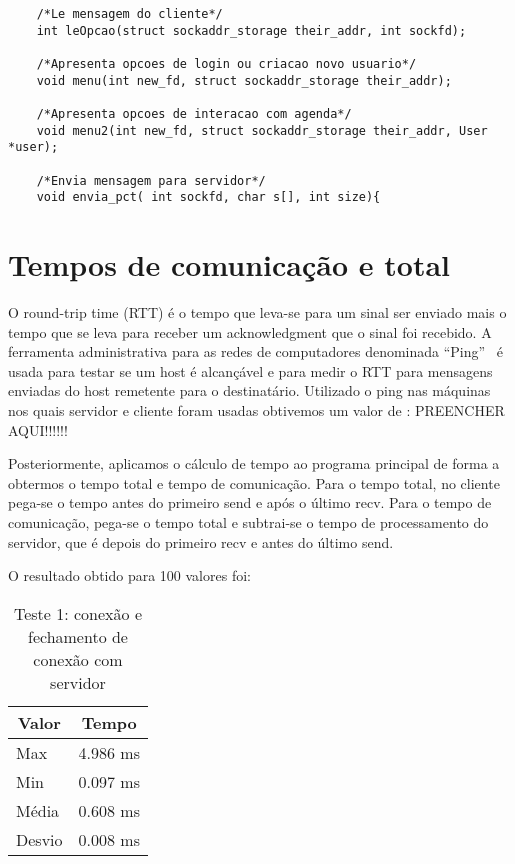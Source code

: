 \documentclass[10pt,a4paper]{article}
\begin{document}
\begin{itemize}
\begin{lstlisting}
    /*Le mensagem do cliente*/
    int leOpcao(struct sockaddr_storage their_addr, int sockfd);
   
    /*Apresenta opcoes de login ou criacao novo usuario*/
    void menu(int new_fd, struct sockaddr_storage their_addr);
  
    /*Apresenta opcoes de interacao com agenda*/
    void menu2(int new_fd, struct sockaddr_storage their_addr, User *user);

    /*Envia mensagem para servidor*/
    void envia_pct( int sockfd, char s[], int size){

  \end{lstlisting}


\end{itemize}


\section{Tempos de comunicação e total}
O round-trip time (RTT) é o tempo que leva-se para um sinal ser
enviado mais o tempo que se leva para receber um acknowledgment que o
sinal foi recebido. A ferramenta administrativa para as redes de
computadores denominada ``Ping''~\cite{Ping} é usada para testar se um host é alcançável e para
medir o RTT para mensagens enviadas do host remetente para o
destinatário.
Utilizado o ping nas máquinas nos quais servidor e cliente foram
usadas obtivemos um valor de : PREENCHER AQUI!!!!!!

Posteriormente, aplicamos o cálculo de tempo ao programa principal de
forma a obtermos o tempo total e tempo de comunicação.
Para o tempo total, no cliente pega-se o tempo antes do primeiro send e após o último recv.
Para o tempo de comunicação, pega-se o tempo total e subtrai-se o tempo de processamento do servidor,
que é depois do primeiro recv e antes do último send.

O resultado obtido para 100 valores foi:

\begin{table}[h!]
\caption{Teste 1: conexão e fechamento de conexão com servidor}
\begin{center}
  \begin{tabular}{lr}
    \multicolumn{1}{c}{Valor} & \multicolumn{1}{c}{Tempo}\\
    \hline
    Max & 4.986 ms\\
    Min & 0.097 ms\\
    Média & 0.608 ms \\
    Desvio & 0.008 ms
  \end{tabular}

\end{center}
\end{table}
\end{document}
